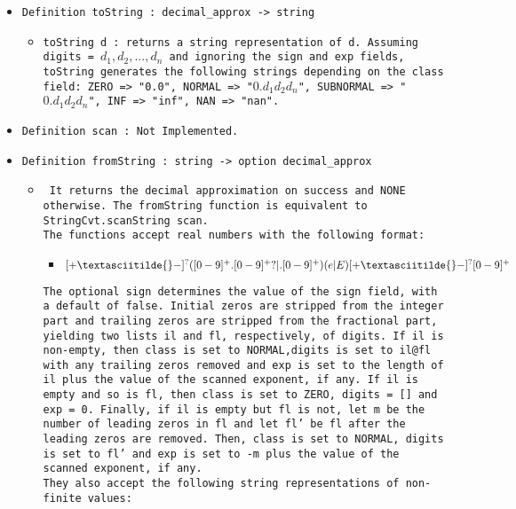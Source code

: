 \documentclass[11pt]{report}
\begin{document}
\begin{itemize}
\begin{itemize}
\end{itemize}

\item \texttt{Definition toString : decimal\_approx -> string}

\begin{itemize}
\item  \begin{flushleft} \texttt{toString d : returns a string representation of d. Assuming digits = $d_1, d_2, ..., d_n$ and ignoring the sign and exp fields, toString generates the following strings depending on the class field: ZERO => "0.0", NORMAL =>	"$0.d_1 d_2 d_n$", SUBNORMAL =>	"$0.d_1 d_2 d_n$", INF => "inf", NAN =>	"nan". } \end{flushleft}


\end{itemize}

\item \texttt{Definition scan : Not Implemented.}



\item \texttt{Definition fromString : string -> option decimal\_approx}

\begin{itemize}
\item \begin{flushleft} \texttt{ It returns the decimal approximation on success and NONE otherwise. The fromString function is equivalent to StringCvt.scanString scan.\\
\coqdocemptyline
The functions accept real numbers with the following format:}\\
\begin{itemize}
\item $[+ \textasciitilde{} -]^?([0-9]^+.[0-9]^+? | .[0-9]^+)(e|E)[+ \textasciitilde{} -]^?[0-9]^+$
\end{itemize}
 
\texttt{The optional sign determines the value of the sign field, with a default of false. Initial zeros are stripped from the integer part and trailing zeros are stripped from the fractional part, yielding two lists il and fl, respectively, of digits. If il is non-empty, then class is set to NORMAL,digits is set to il@fl with any trailing zeros removed and exp is set to the length of il plus the value of the scanned exponent, if any. If il is empty and so is fl, then class is set to ZERO, digits = [] and exp = 0. Finally, if il is empty but fl is not, let m be the number of leading zeros in fl and let fl' be fl after the leading zeros are removed. Then, class is set to NORMAL, digits is set to fl' and exp is set to -m plus the value of the scanned exponent, if any.\\
\coqdocemptyline
They also accept the following string representations of non-finite values:}


\end{flushleft}
\end{itemize}
\end{itemize}
\end{document}
